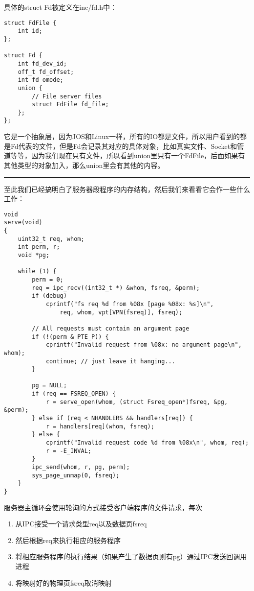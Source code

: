 \documentclass{article}
\begin{document}
\begin{CJK*}{UTF8}{gkai}
具体的struct Fd被定义在inc/fd.h中：


\begin{lstlisting}[style=ccode, firstnumber=26, title={\scriptsize \ttfamily \bfseries inc/fd.h}]
struct FdFile {
	int id;
};
 
struct Fd {
	int fd_dev_id;
	off_t fd_offset;
	int fd_omode;
	union {
		// File server files
		struct FdFile fd_file;
	};
};
\end{lstlisting}

它是一个抽象层，因为JOS和Linux一样，所有的IO都是文件，所以用户看到的都是Fd代表的文件，但是Fd会记录其对应的具体对象，比如真实文件、Socket和管道等等，因为我们现在只有文件，所以看到union里只有一个FdFile，后面如果有其他类型的对象加入，那么union里会有其他的内容。

\vspace{2em}
\hrule
\vspace{2em}

至此我们已经搞明白了服务器段程序的内存结构，然后我们来看看它会作一些什么工作：


\begin{lstlisting}[style=ccode, title={\scriptsize \ttfamily \bfseries fs/serv.c: serve()}]
void
serve(void)
{
    uint32_t req, whom;
    int perm, r;
    void *pg;

    while (1) {
        perm = 0;
        req = ipc_recv((int32_t *) &whom, fsreq, &perm);
        if (debug)
            cprintf("fs req %d from %08x [page %08x: %s]\n",
                req, whom, vpt[VPN(fsreq)], fsreq);

        // All requests must contain an argument page
        if (!(perm & PTE_P)) {
            cprintf("Invalid request from %08x: no argument page\n", whom);
            continue; // just leave it hanging...
        }

        pg = NULL;
        if (req == FSREQ_OPEN) {
            r = serve_open(whom, (struct Fsreq_open*)fsreq, &pg, &perm);
        } else if (req < NHANDLERS && handlers[req]) {
            r = handlers[req](whom, fsreq);
        } else {
            cprintf("Invalid request code %d from %08x\n", whom, req);
            r = -E_INVAL;
        }
        ipc_send(whom, r, pg, perm);
        sys_page_unmap(0, fsreq);
    }
}
\end{lstlisting}

服务器主循环会使用轮询的方式接受客户端程序的文件请求，每次

\begin{enumerate}
\item{从IPC接受一个请求类型req以及数据页fsreq}
\item{然后根据req来执行相应的服务程序}
\item{将相应服务程序的执行结果（如果产生了数据页则有pg）通过IPC发送回调用进程}
\item{将映射好的物理页fsreq取消映射}
\end{enumerate}


\end{CJK*}
\end{document}
